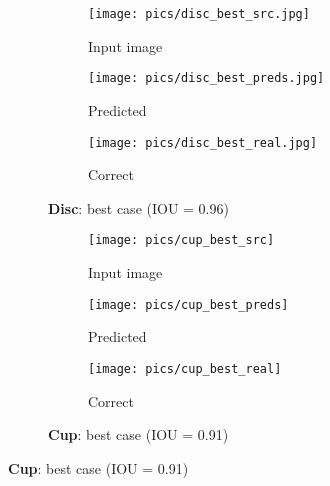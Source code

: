 \documentclass{llncs}
\begin{document}
\begin{figure}[h!]
	\begin{subfigure}[t]{0.5\textwidth}
		\begin{subfigure}[t]{0.3\textwidth}
			\texttt{[image: pics/disc\_best\_src.jpg]} 
			\caption*{Input image}
		\end{subfigure}
		\begin{subfigure}[t]{0.3\textwidth}
			\texttt{[image: pics/disc\_best\_preds.jpg]} 
			\caption*{Predicted}
		\end{subfigure}
		\begin{subfigure}[t]{0.3\textwidth}
			\texttt{[image: pics/disc\_best\_real.jpg]} 
			\caption*{Correct}
		\end{subfigure}
		\caption*{\textbf{Disc}: best case (IOU = 0.96)}
	\end{subfigure}
	\hspace{0.15cm}
	\begin{subfigure}[t]{0.5\textwidth}
		\begin{subfigure}[t]{0.3\textwidth}
			\texttt{[image: pics/cup\_best\_src]} 
			\caption*{Input image}
		\end{subfigure}
		\begin{subfigure}[t]{0.3\textwidth}
			\texttt{[image: pics/cup\_best\_preds]} 
			\caption*{Predicted}
		\end{subfigure}
		\begin{subfigure}[t]{0.3\textwidth}
			\texttt{[image: pics/cup\_best\_real]} 
			\caption*{Correct}
		\end{subfigure}
		\caption*{\textbf{Cup}: best case (IOU = 0.91)}
	\end{subfigure}
	\vspace{0.2cm}
	

\end{figure}
\end{document}
